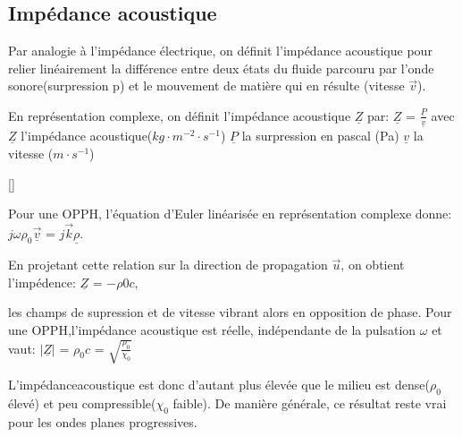 \documentclass[a4paper, 12pt]{article}
\begin{document}
\subsection{Impédance acoustique}

\begin{text}
Par analogie à l'impédance électrique, on définit l'impédance acoustique pour relier linéairement la différence entre deux états du fluide parcouru par l'onde sonore(surpression p) et le mouvement de matière qui en résulte (vitesse $\vec v$).
\end{text}
\begin{defn}[]
En représentation complexe, on définit l'impédance acoustique $\underline{Z}$ par:\newline 
$\underline{Z}$ = $\frac{\underline{P}}{\underline{v}}$\newline
avec $\underline{Z}$ l'impédance acoustique($kg\cdot m^{-2}\cdot s^{-1}$)\newline
$\underline{P}$ la surpression en pascal (Pa)\newline
$\underline{v}$ la vitesse ($m \cdot s^{-1}$)\newline
\end{defn}[]
\begin{text}
Pour une OPPH, l'équation d'Euler linéarisée en représentation complexe donne: \newline 
$j\omega \rho_{0}\vec \underline{v}$ = $j\vec k\underline{\rho}$.\newline

En projetant cette relation sur la direction de propagation $\vec u$, on obtient l'impédence:\newline 
$\underline{Z}$ = $-\rho{0}c$,\newline

les champs de supression et de vitesse vibrant alors en opposition de phase.\newline 
Pour une OPPH,l'impédance acoustique est réelle, indépendante de la pulsation $\omega$ et vaut:\newline
$|\underline{Z}|$ = $\rho_{0}c$ = $\sqrt{\frac{\rho_{0}}{\chi_{0}}}$\newline 

L'impédanceacoustique est donc d'autant plus élevée que le milieu est dense($\rho_{0}$ élevé) et peu compressible($\chi_{0}$ faible). De manière générale, ce résultat reste vrai pour les ondes planes progressives.
\end{text}
\end{document}
